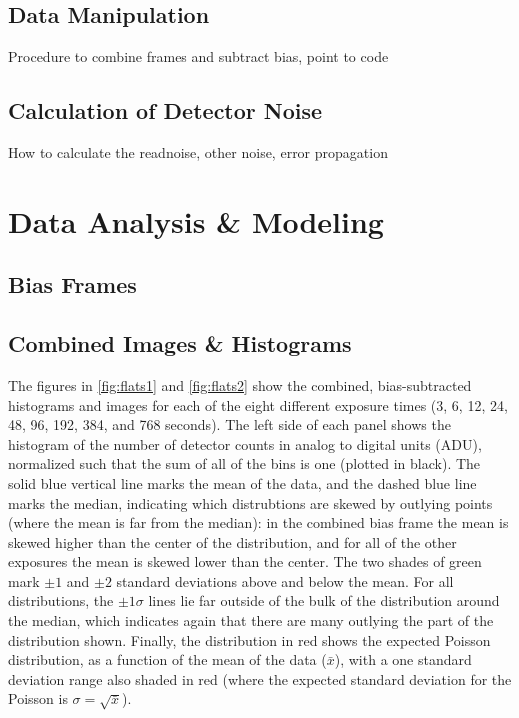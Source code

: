 \documentclass[preprint]{aastex62}
\begin{document}
\subsection{Data Manipulation}
Procedure to combine frames and subtract bias, point to code

\subsection{Calculation of Detector Noise}
How to calculate the readnoise, other noise, error propagation

\section{Data Analysis \& Modeling}
\subsection{Bias Frames}

\subsection{Combined Images \& Histograms}
The figures in \ref{fig:flats1} and \ref{fig:flats2} show the combined, bias-subtracted histograms and images for each of the eight different exposure times (3, 6, 12, 24, 48, 96, 192, 384, and 768 seconds). The left side of each panel shows the histogram of the number of detector counts in analog to digital units (ADU), normalized such that the sum of all of the bins is one (plotted in black). The solid blue vertical line marks the mean of the data, and the dashed blue line marks the median, indicating which distrubtions are skewed by outlying points (where the mean is far from the median): in the combined bias frame the mean is skewed higher than the center of the distribution, and for all of the other exposures the mean is skewed lower than the center. The two shades of green mark $\pm1$ and $\pm2$ standard deviations above and below the mean. For all distributions, the $\pm1\sigma$ lines lie far outside of the bulk of the distribution around the median, which indicates again that there are many outlying the part of the distribution shown. Finally, the distribution in red shows the expected Poisson distribution, as a function of the mean of the data ($\bar{x}$), with a one standard deviation range also shaded in red (where the expected standard deviation for the Poisson is $\sigma=\sqrt{\bar{x}}$).  
\end{document}
